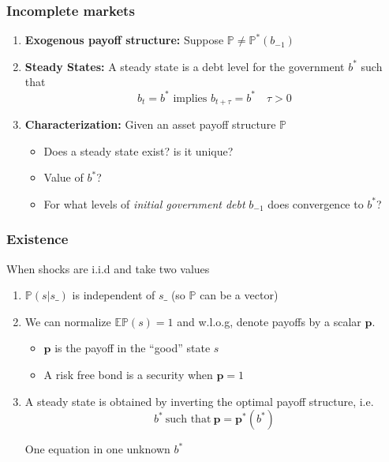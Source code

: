 \documentclass{beamer}
\begin{document}
%
\begin{frame}
	\frametitle{Incomplete markets }
	\begin{enumerate}
		\item  \textbf{Exogenous payoff structure:} Suppose $\mathbb{P}\neq \mathbb{P}^*(b_{-1})$
		
		\item \textbf{Steady States: } A steady state is a debt level for the government $b^*$ such that
		\[b_{t}=b^* \text{ implies } b_{t+\tau}=b^*\quad \tau >0\]
	
			
		\item \textbf{Characterization: } Given an asset payoff structure $\mathbb{P}$
		\begin{itemize}
			\item Does a steady state exist? is it unique?
			\item Value of $b^*$?
			\item For what levels of  \emph{initial government debt} $b_{-1}$ does  convergence to $b^*$?
 			\end{itemize}
	\end{enumerate}
\end{frame}



 \begin{frame}
  \frametitle{Existence}


 When shocks are i.i.d and take two values

  \begin{enumerate}

\item $\mathbb{P}(s|s\_)$ is independent of $s\_$ (so $\mathbb{P}$ can be a vector)
\item We can normalize $\mathbb{E}\mathbb{P}(s)=1$ and w.l.o.g, denote payoffs by a scalar $\bm{p}$.
\begin{itemize}
 \item $\bm{p}$ is the payoff in the ``good'' state $s$
 \item A risk free bond is a security when $\bm{p}=1$
\end{itemize}

\item A steady state is obtained by inverting the optimal payoff structure, i.e.
\begin{equation}
\label{eq-ss}
b^* \ \textrm{such that} \  \bm{p}=\bm{p}^*(b^*)
\end{equation}

One equation in one unknown $b^*$
\end{enumerate}
\end{frame}
\end{document}

